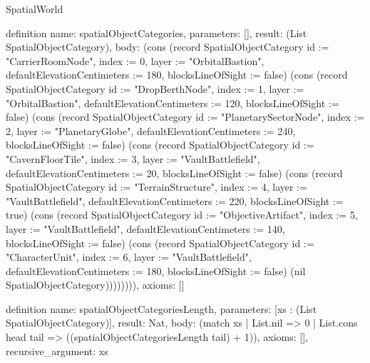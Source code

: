 \begin{lexlean}{SpatialWorld}
\begin{semanticmodule}
definition{
  name: spatialObjectCategories,
  parameters: [],
  result: (List SpatialObjectCategory),
  body: (cons (record SpatialObjectCategory {id := "CarrierRoomNode", index := 0, layer := "OrbitalBastion", defaultElevationCentimeters := 180, blocksLineOfSight := false}) (cons (record SpatialObjectCategory {id := "DropBerthNode", index := 1, layer := "OrbitalBastion", defaultElevationCentimeters := 120, blocksLineOfSight := false}) (cons (record SpatialObjectCategory {id := "PlanetarySectorNode", index := 2, layer := "PlanetaryGlobe", defaultElevationCentimeters := 240, blocksLineOfSight := false}) (cons (record SpatialObjectCategory {id := "CavernFloorTile", index := 3, layer := "VaultBattlefield", defaultElevationCentimeters := 20, blocksLineOfSight := false}) (cons (record SpatialObjectCategory {id := "TerrainStructure", index := 4, layer := "VaultBattlefield", defaultElevationCentimeters := 220, blocksLineOfSight := true}) (cons (record SpatialObjectCategory {id := "ObjectiveArtifact", index := 5, layer := "VaultBattlefield", defaultElevationCentimeters := 140, blocksLineOfSight := false}) (cons (record SpatialObjectCategory {id := "CharacterUnit", index := 6, layer := "VaultBattlefield", defaultElevationCentimeters := 180, blocksLineOfSight := false}) (nil SpatialObjectCategory)))))))),
  axioms: []
}

definition{
  name: spatialObjectCategoriesLength,
  parameters: [xs : (List SpatialObjectCategory)],
  result: Nat,
  body: (match xs
    | List.nil => 0
    | List.cons head tail => ((spatialObjectCategoriesLength tail) + 1)),
  axioms: [],
  recursive_argument: xs
}


\end{semanticmodule}
\end{lexlean}
